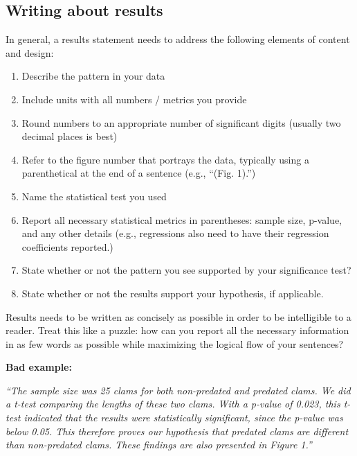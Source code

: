 \documentclass[
]{book}
\providecommand{\tightlist}{%
  \setlength{\itemsep}{0pt}\setlength{\parskip}{0pt}}
\begin{document}
\hypertarget{writing-about-results}{%
\subsection*{Writing about results}\label{writing-about-results}}

In general, a results statement needs to address the following elements of content and design:

\begin{enumerate}
\def\labelenumi{\arabic{enumi}.}
\tightlist
\item
  Describe the pattern in your data\\
\item
  Include units with all numbers / metrics you provide\\
\item
  Round numbers to an appropriate number of significant digits (usually two decimal places is best)\\
\item
  Refer to the figure number that portrays the data, typically using a parenthetical at the end of a sentence (e.g., ``(Fig. 1).'')\\
\item
  Name the statistical test you used\\
\item
  Report all necessary statistical metrics in parentheses: sample size, p-value, and any other details (e.g., regressions also need to have their regression coefficients reported.)\\
\item
  State whether or not the pattern you see supported by your significance test?
\item
  State whether or not the results support your hypothesis, if applicable.
\end{enumerate}

Results needs to be written as concisely as possible in order to be intelligible to a reader. Treat this like a puzzle: how can you report all the necessary information in as few words as possible while maximizing the logical flow of your sentences?

\textbf{Bad example:}

\emph{``The sample size was 25 clams for both non-predated and predated clams. We did a t-test comparing the lengths of these two clams. With a p-value of 0.023, this t-test indicated that the results were statistically significant, since the p-value was below 0.05. This therefore proves our hypothesis that predated clams are different than non-predated clams. These findings are also presented in Figure 1.''}
\end{document}
